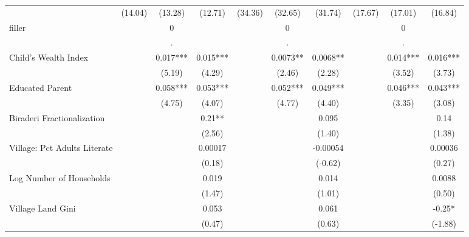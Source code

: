 \begin{sidewaystable}[htbp]
\begin{tabular}{l*{9}{c}}
                &  (14.04)   &  (13.28)   &  (12.71)   &  (34.36)   &  (32.65)   &  (31.74)   &  (17.67)   &  (17.01)   &  (16.84)   \\
filler          &            &        0   &            &            &        0   &            &            &        0   &            \\
                &            &        .   &            &            &        .   &            &            &        .   &            \\
Child's Wealth Index&            &    0.017***&    0.015***&            &   0.0073** &   0.0068** &            &    0.014***&    0.016***\\
                &            &   (5.19)   &   (4.29)   &            &   (2.46)   &   (2.28)   &            &   (3.52)   &   (3.73)   \\
Educated Parent &            &    0.058***&    0.053***&            &    0.052***&    0.049***&            &    0.046***&    0.043***\\
                &            &   (4.75)   &   (4.07)   &            &   (4.77)   &   (4.40)   &            &   (3.35)   &   (3.08)   \\
Biraderi Fractionalization&            &            &     0.21** &            &            &    0.095   &            &            &     0.14   \\
                &            &            &   (2.56)   &            &            &   (1.40)   &            &            &   (1.38)   \\
Village: Pct Adults Literate&            &            &  0.00017   &            &            & -0.00054   &            &            &  0.00036   \\
                &            &            &   (0.18)   &            &            &  (-0.62)   &            &            &   (0.27)   \\
Log Number of Households&            &            &    0.019   &            &            &    0.014   &            &            &   0.0088   \\
                &            &            &   (1.47)   &            &            &   (1.01)   &            &            &   (0.50)   \\
Village Land Gini&            &            &    0.053   &            &            &    0.061   &            &            &    -0.25*  \\
                &            &            &   (0.47)   &            &            &   (0.63)   &            &            &  (-1.88)   \\

\end{tabular}
\end{sidewaystable}
